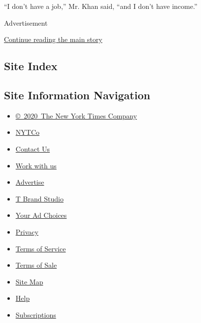 ``I don't have a job,'' Mr. Khan said, ``and I don't have income.''

Advertisement

\protect\hyperlink{after-bottom}{Continue reading the main story}

\hypertarget{site-index}{%
\subsection{Site Index}\label{site-index}}

\hypertarget{site-information-navigation}{%
\subsection{Site Information
Navigation}\label{site-information-navigation}}

\begin{itemize}
\tightlist
\item
  \href{https://help.nytimes.com/hc/en-us/articles/115014792127-Copyright-notice}{©~2020~The
  New York Times Company}
\end{itemize}

\begin{itemize}
\tightlist
\item
  \href{https://www.nytco.com/}{NYTCo}
\item
  \href{https://help.nytimes.com/hc/en-us/articles/115015385887-Contact-Us}{Contact
  Us}
\item
  \href{https://www.nytco.com/careers/}{Work with us}
\item
  \href{https://nytmediakit.com/}{Advertise}
\item
  \href{http://www.tbrandstudio.com/}{T Brand Studio}
\item
  \href{https://www.nytimes.com/privacy/cookie-policy\#how-do-i-manage-trackers}{Your
  Ad Choices}
\item
  \href{https://www.nytimes.com/privacy}{Privacy}
\item
  \href{https://help.nytimes.com/hc/en-us/articles/115014893428-Terms-of-service}{Terms
  of Service}
\item
  \href{https://help.nytimes.com/hc/en-us/articles/115014893968-Terms-of-sale}{Terms
  of Sale}
\item
  \href{https://spiderbites.nytimes.com}{Site Map}
\item
  \href{https://help.nytimes.com/hc/en-us}{Help}
\item
  \href{https://www.nytimes.com/subscription?campaignId=37WXW}{Subscriptions}
\end{itemize}
